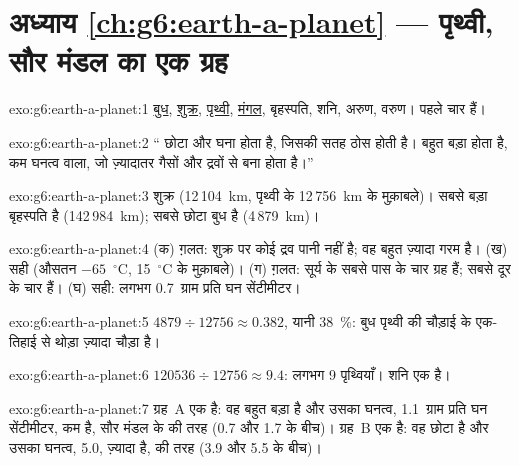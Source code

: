 \section*{अध्याय \ref{ch:g6:earth-a-planet} --- पृथ्वी, सौर मंडल का एक ग्रह}

\begin{solution}{exo:g6:earth-a-planet:1}
\underline{बुध}, \underline{शुक्र}, \underline{पृथ्वी},
\underline{मंगल}, बृहस्पति, शनि, अरुण, वरुण।  पहले चार
हैं।
\end{solution}

\begin{solution}{exo:g6:earth-a-planet:2}
`` छोटा और घना होता है, जिसकी सतह ठोस होती है।  बहुत बड़ा
होता है, कम घनत्व वाला, जो ज़्यादातर गैसों और द्रवों से बना होता है।''
\end{solution}

\begin{solution}{exo:g6:earth-a-planet:3}
शुक्र (12\,104~km, पृथ्वी के 12\,756~km के मुक़ाबले)। सबसे बड़ा
बृहस्पति है (142\,984~km); सबसे छोटा बुध है (4\,879~km)।
\end{solution}

\begin{solution}{exo:g6:earth-a-planet:4}
(क) ग़लत: शुक्र पर कोई द्रव पानी नहीं है; वह बहुत ज़्यादा गरम है। (ख) सही
(औसतन $-65$~$^\circ$C, 15~$^\circ$C के मुक़ाबले)। (ग) ग़लत: सूर्य के सबसे पास के
चार ग्रह  हैं;  सबसे दूर के चार हैं। (घ) सही: लगभग
0.7~ग्राम प्रति घन सेंटीमीटर।
\end{solution}

\begin{solution}{exo:g6:earth-a-planet:5}
$4879 \div 12756 \approx 0.382$, यानी 38~\%: बुध पृथ्वी की चौड़ाई के एक-तिहाई से
थोड़ा ज़्यादा चौड़ा है।
\end{solution}

\begin{solution}{exo:g6:earth-a-planet:6}
$120536 \div 12756 \approx 9.4$: लगभग 9 पृथ्वियाँ। शनि एक  है।
\end{solution}

\begin{solution}{exo:g6:earth-a-planet:7}
ग्रह~A एक  है: वह बहुत बड़ा है और उसका घनत्व, 1.1~ग्राम प्रति घन
सेंटीमीटर, कम है, सौर मंडल के  की तरह
(0.7 और 1.7 के बीच)। ग्रह~B एक  है: वह छोटा है और उसका घनत्व, 5.0,
ज़्यादा है,  की तरह (3.9 और
5.5 के बीच)।
\end{solution}

